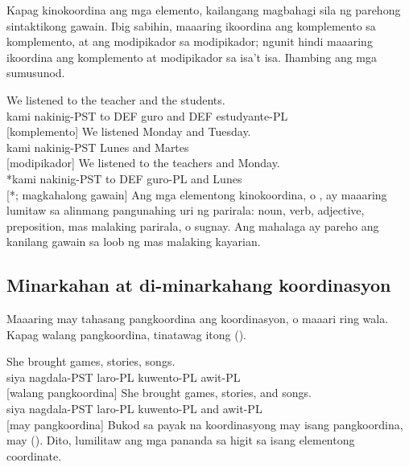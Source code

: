 Kapag kinokoordina ang mga elemento, kailangang magbahagi sila ng parehong sintaktikong gawain. Ibig sabihin, maaaring ikoordina ang komplemento sa komplemento, at ang modipikador sa modipikador; ngunit hindi maaaring ikoordina ang komplemento at modipikador sa isa't isa. Ihambing ang mga sumusunod.

\ea \label{ex:coord-function-tl}
    \ea \gll We listened {\ob}to the teacher{\cb} {\ob}and the students{\cb}.\\
        kami nakinig-PST to DEF guro and DEF estudyante-PL\\
    \glt {} [komplemento]
    \ex \gll We listened {\ob}Monday{\cb} and {\ob}Tuesday{\cb}.\\
        kami nakinig-PST Lunes and Martes\\
    \glt {} [modipikador]
    \ex \gll *We listened {\ob}to the teachers{\cb} and {\ob}Monday{\cb}.\\
        *kami nakinig-PST to DEF guro-PL and Lunes\\
    \glt {} [*; magkahalong gawain]
    \z
\z
Ang mga elementong kinokoordina, o , ay maaaring lumitaw sa alinmang pangunahing uri ng parirala: noun, verb, adjective, preposition, mas malaking parirala, o sugnay. Ang mahalaga ay pareho ang kanilang gawain sa loob ng mas malaking kayarian.

\subsection{Minarkahan at di-minarkahang koordinasyon}

Maaaring may tahasang pangkoordina ang koordinasyon, o maaari ring wala. Kapag walang pangkoordina, tinatawag itong  ().

\ea \label{ex:coord-marking-tl}
    \ea \gll She brought {\ob}games{\cb}, {\ob}stories{\cb}, {\ob}songs{\cb}.\\
        siya nagdala-PST laro-PL kuwento-PL awit-PL\\
    \glt {} [walang pangkoordina]
    \ex \gll She brought {\ob}games{\cb}, {\ob}stories{\cb}, and {\ob}songs{\cb}.\\
        siya nagdala-PST laro-PL kuwento-PL and awit-PL\\
    \glt {} [may pangkoordina]
    \z
\z
Bukod sa payak na koordinasyong may isang pangkoordina, may  (). Dito, lumilitaw ang mga pananda sa higit sa isang elementong coordinate.

